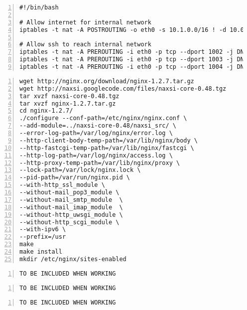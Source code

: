 \documentclass[Configuration]{subfiles}
\begin{document}
\begin{lstlisting}[frame=single,caption=/etc/network/interfaces,backgroundcolor=\color{gray},breaklines=true,numbers=left,]
#!/bin/bash

# Allow internet for internal network
iptables -t nat -A POSTROUTING -o eth0 -s 10.1.0.0/16 ! -d 10.0.0.0/8 -j SNAT --to-source 145.100.104.61

# Allow ssh to reach internal network
iptables -t nat -A PREROUTING -i eth0 -p tcp --dport 1002 -j DNAT --to-destination 10.1.1.2:22
iptables -t nat -A PREROUTING -i eth0 -p tcp --dport 1003 -j DNAT --to-destination 10.1.2.2:22
iptables -t nat -A PREROUTING -i eth0 -p tcp --dport 1004 -j DNAT --to-destination 10.1.3.2:22
\end{lstlisting}

\begin{lstlisting}[frame=single,caption=Compiling nginx+naxsi,backgroundcolor=\color{gray},breaklines=true,numbers=left,]
wget http://nginx.org/download/nginx-1.2.7.tar.gz
wget http://naxsi.googlecode.com/files/naxsi-core-0.48.tgz
tar xvzf naxsi-core-0.48.tgz
tar xvzf nginx-1.2.7.tar.gz
cd nginx-1.2.7/
./configure --conf-path=/etc/nginx/nginx.conf \
--add-module=../naxsi-core-0.48/naxsi_src/ \
--error-log-path=/var/log/nginx/error.log \
--http-client-body-temp-path=/var/lib/nginx/body \
--http-fastcgi-temp-path=/var/lib/nginx/fastcgi \
--http-log-path=/var/log/nginx/access.log \
--http-proxy-temp-path=/var/lib/nginx/proxy \
--lock-path=/var/lock/nginx.lock \
--pid-path=/var/run/nginx.pid \
--with-http_ssl_module \
--without-mail_pop3_module \
--without-mail_smtp_module  \
--without-mail_imap_module  \
--without-http_uwsgi_module \
--without-http_scgi_module \
--with-ipv6 \
--prefix=/usr
make
make install
mkdir /etc/nginx/sites-enabled
\end{lstlisting}

\begin{lstlisting}[frame=single,caption=/etc/nginx/nginx.conf,backgroundcolor=\color{gray},breaklines=true,numbers=left,]
TO BE INCLUDED WHEN WORKING
\end{lstlisting}

\begin{lstlisting}[frame=single,caption=/etc/nginx/sites-enabled/default,backgroundcolor=\color{gray},breaklines=true,numbers=left,]
TO BE INCLUDED WHEN WORKING
\end{lstlisting}

\begin{lstlisting}[frame=single,caption=/etc/nginx/nbs.rules,backgroundcolor=\color{gray},breaklines=true,numbers=left,]
TO BE INCLUDED WHEN WORKING
\end{lstlisting}
\end{document}
